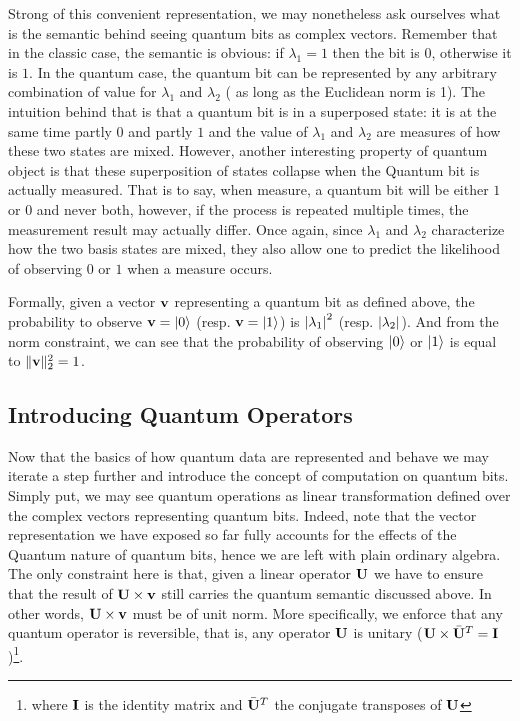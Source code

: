 \documentclass[a4paper]{article}
\begin{document}
Strong of this convenient representation, we may nonetheless ask ourselves what is the semantic behind seeing quantum bits as complex vectors. Remember that in the classic case, the semantic is obvious: if $\lambda_1 = 1$ then the bit is $0$, otherwise it is $1$. In the quantum case, the quantum bit can be represented by any arbitrary combination of value for $\lambda_1$ and $\lambda_2$ ( as long as the Euclidean norm is 1). The intuition behind that is that a quantum bit is in a superposed state: it is at the same time partly $0$ and partly $1$ and the value of $\lambda_1$ and $\lambda_2$ are measures of how these two states are mixed. However, another interesting property of quantum object is that these superposition of states collapse when the Quantum bit is actually measured. That is to say, when measure, a quantum bit will be either $1$ or $0$ and never both, however, if the process is repeated multiple times, the measurement result may actually differ. Once again, since $\lambda_1$ and $\lambda_2$ characterize how the two basis states are mixed, they also allow one to predict the likelihood of observing $0$ or $1$ when a measure occurs. 

Formally, given a vector $\mathbf{v}$ representing a quantum bit as defined above, the probability to observe $\mathbf{v} = \left| 0 \right>$ (resp. $\mathbf{v} = \left| 1 \right>$) is $\left| \lambda_1 \right|^2$ (resp. $\left| \lambda_2 \right|$). And from the norm constraint, we can see that the probability of observing $\left| 0 \right>$ or $\left| 1 \right>$ is equal to $\Vert \mathbf{v} \Vert_2^2 = 1$.

\subsection{Introducing Quantum Operators}

Now that the basics of how quantum data are represented and behave we may iterate a step further and introduce the concept of computation on quantum bits. Simply put, we may see quantum operations as linear transformation defined over the complex vectors representing quantum bits. Indeed, note that the vector representation we have exposed so far fully accounts for the effects of the Quantum nature of quantum bits, hence we are left with plain ordinary algebra. The only constraint here is that, given a linear operator $\mathbf{U}$ we have to ensure that the result of $\mathbf{U} \times \mathbf{v}$ still carries the quantum semantic discussed above. In other words, $\mathbf{U} \times \mathbf{v}$ must be of unit norm. More specifically, we enforce that any quantum operator is reversible, that is, any operator $\mathbf{U}$ is unitary ($\mathbf{U} \times \bar{\mathbf{U}}^T = \mathbf{I}$)\footnote{where $\mathbf{I}$ is the identity matrix and $\bar{\mathbf{U}}^T$ the conjugate transposes of $\mathbf{U}$}. 
\end{document}
